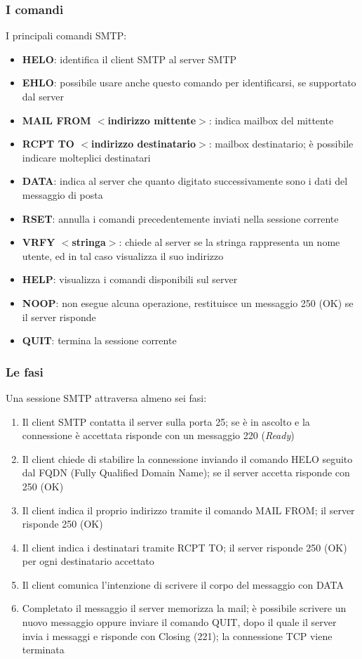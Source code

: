 \subsubsection{I comandi}
I principali comandi SMTP:
\begin{itemize}
    \item \textbf{HELO}: identifica il client SMTP al server SMTP
    \item \textbf{EHLO}: possibile usare anche questo comando per identificarsi, se supportato dal server
    \item \textbf{MAIL FROM $<$indirizzo mittente$>$}: indica mailbox del mittente 
    \item \textbf{RCPT TO $<$indirizzo destinatario$>$}: mailbox destinatario; è possibile 
    indicare molteplici destinatari 
    \item \textbf{DATA}: indica al server che quanto digitato successivamente sono i dati del messaggio di posta
    \item \textbf{RSET}: annulla i comandi precedentemente inviati nella sessione corrente 
    \item \textbf{VRFY $<$stringa$>$}: chiede al server se la stringa rappresenta un nome utente, ed in tal 
    caso visualizza il suo indirizzo 
    \item \textbf{HELP}: visualizza i comandi disponibili sul server 
    \item \textbf{NOOP}: non esegue alcuna operazione, restituisce un messaggio 250 (OK) se il server risponde 
    \item \textbf{QUIT}: termina la sessione corrente
\end{itemize}

\subsubsection{Le fasi}
Una sessione SMTP attraversa almeno sei fasi:
\begin{enumerate}
    \item Il client SMTP contatta il server sulla porta 25; se è in ascolto e 
    la connessione è accettata risponde con un messaggio 220 (\textit{Ready})
    \item Il client chiede di stabilire la connessione inviando il comando HELO seguito 
    dal FQDN (Fully Qualified Domain Name); se il server accetta risponde con 250 (OK)
    \item Il client indica il proprio indirizzo tramite il comando MAIL FROM; il server risponde 250 (OK)
    \item Il client indica i destinatari tramite RCPT TO; il server risponde 250 (OK) per ogni destinatario accettato 
    \item Il client comunica l'intenzione di scrivere il corpo del messaggio con DATA
    \item Completato il messaggio il server memorizza la mail; è possibile scrivere un nuovo messaggio 
    oppure inviare il comando QUIT, dopo il quale il server invia i messaggi e risponde con Closing (221); la 
    connessione TCP viene terminata
\end{enumerate}

